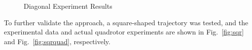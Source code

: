 \documentclass[letterpaper, 10 pt, conference]{ieeeconf}  %
\begin{document}
\begin{figure}[ht]
    \centering
    \caption{Diagonal Experiment Results}
\end{figure}

To further validate the approach, a square-shaped trajectory was tested, and the experimental data and actual quadrotor experiments are shown in Fig.~\ref{fig:sqr} and Fig.~\ref{fig:sqrquad}, respectively.
\end{document}
